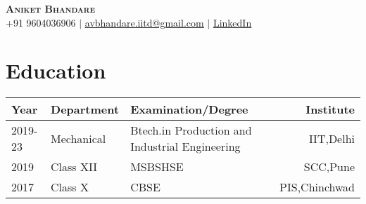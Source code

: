 \documentclass[letterpaper,11pt]{article}
\begin{document}
\begin{center}
    \textbf{\huge \scshape Aniket Bhandare } \\ \vspace{5pt}
    \small+91 9604036906 $|$ \href{mailto:avbhandare.iitd@gmail.com}{\underline{avbhandare.iitd@gmail.com}} $|$ 
    \href{https://linkedin.com/in/aditya-kumar-inductor}{\underline{LinkedIn}} 
    
\end{center}


\section*{Education}\vspace{-3mm}
    \begin{table}[h!]
      \begin{center}
        \begin{tabular}{p{}p{}p{}r{}} %
          \toprule
          \textbf{Year} & \textbf{Department} & \textbf{Examination/Degree}& \textbf{Institute }\\ \midrule
         
          2019-23 & Mechanical & Btech.in Production and Industrial Engineering & IIT,Delhi\\
          2019  & Class XII  & MSBSHSE & SCC,Pune\\
          2017 & Class X    & CBSE   & PIS,Chinchwad \\ \bottomrule
        \end{tabular}
      \end{center}
    \end{table}\vspace{-8mm}

\end{document}
